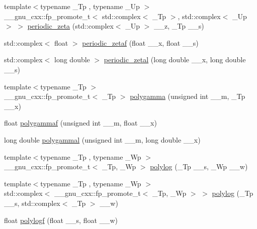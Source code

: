 \begin{DoxyCompactItemize}
\item 
{\footnotesize template$<$typename \+\_\+\+Tp , typename \+\_\+\+Up $>$ }\\\+\_\+\+\_\+gnu\+\_\+cxx\+::fp\+\_\+promote\+\_\+t$<$ std\+::complex$<$ \+\_\+\+Tp $>$, std\+::complex$<$ \+\_\+\+Up $>$ $>$ \hyperlink{group__gnu__math__spec__func_gaf3704ce510319b5c4c5cedd55dfaa42f}{periodic\+\_\+zeta} (std\+::complex$<$ \+\_\+\+Up $>$ \+\_\+\+\_\+z, \+\_\+\+Tp \+\_\+\+\_\+s)
\item 
std\+::complex$<$ float $>$ \hyperlink{group__gnu__math__spec__func_ga1308c2a5d1b263757485cb48eb2c19ff}{periodic\+\_\+zetaf} (float \+\_\+\+\_\+x, float \+\_\+\+\_\+s)
\item 
std\+::complex$<$ long double $>$ \hyperlink{group__gnu__math__spec__func_gab7573fb57ebaabac4432bb5e6b525151}{periodic\+\_\+zetal} (long double \+\_\+\+\_\+x, long double \+\_\+\+\_\+s)
\item 
{\footnotesize template$<$typename \+\_\+\+Tp $>$ }\\\+\_\+\+\_\+gnu\+\_\+cxx\+::fp\+\_\+promote\+\_\+t$<$ \+\_\+\+Tp $>$ \hyperlink{group__gnu__math__spec__func_ga65e674e7fe1457e819897e0d608c18b8}{polygamma} (unsigned int \+\_\+\+\_\+m, \+\_\+\+Tp \+\_\+\+\_\+x)
\item 
float \hyperlink{group__gnu__math__spec__func_ga91861fadef76d4f73afacffcac66e312}{polygammaf} (unsigned int \+\_\+\+\_\+m, float \+\_\+\+\_\+x)
\item 
long double \hyperlink{group__gnu__math__spec__func_gaa6a37359a97ba43f32aa842705c416d4}{polygammal} (unsigned int \+\_\+\+\_\+m, long double \+\_\+\+\_\+x)
\item 
{\footnotesize template$<$typename \+\_\+\+Tp , typename \+\_\+\+Wp $>$ }\\\+\_\+\+\_\+gnu\+\_\+cxx\+::fp\+\_\+promote\+\_\+t$<$ \+\_\+\+Tp, \+\_\+\+Wp $>$ \hyperlink{group__gnu__math__spec__func_gabcc5480ad739561c2debd6a8a352084f}{polylog} (\+\_\+\+Tp \+\_\+\+\_\+s, \+\_\+\+Wp \+\_\+\+\_\+w)
\item 
{\footnotesize template$<$typename \+\_\+\+Tp , typename \+\_\+\+Wp $>$ }\\std\+::complex$<$ \+\_\+\+\_\+gnu\+\_\+cxx\+::fp\+\_\+promote\+\_\+t$<$ \+\_\+\+Tp, \+\_\+\+Wp $>$ $>$ \hyperlink{group__gnu__math__spec__func_ga817a208972a0200b667c68d199176d70}{polylog} (\+\_\+\+Tp \+\_\+\+\_\+s, std\+::complex$<$ \+\_\+\+Tp $>$ \+\_\+\+\_\+w)
\item 
float \hyperlink{group__gnu__math__spec__func_ga5bcdd35473144a6d8efc258a79bc82d8}{polylogf} (float \+\_\+\+\_\+s, float \+\_\+\+\_\+w)

\end{DoxyCompactItemize}
